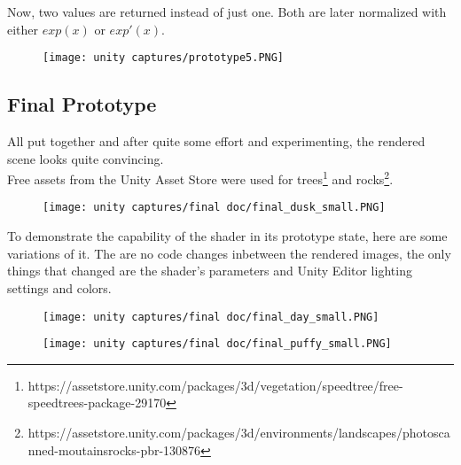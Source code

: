 \noindent
Now, two values are returned instead of just one. Both are later normalized with either $exp(x)$ or $exp'(x)$.

\begin{figure}[H]
    \centering
    \texttt{[image: unity captures/prototype5.PNG]}
    \label{img:captures:prototype5}
\end{figure}

\clearpage
\subsection{Final Prototype}
All put together and after quite some effort and experimenting, the rendered scene looks quite convincing. 
\\
Free assets from the Unity Asset Store were used for trees\footnote[1]{https://assetstore.unity.com/packages/3d/vegetation/speedtree/free-speedtrees-package-29170} and rocks\footnote[2]{https://assetstore.unity.com/packages/3d/environments/landscapes/photoscanned-moutainsrocks-pbr-130876}.

\begin{figure}[H]
    \centering
    \texttt{[image: unity captures/final doc/final\_dusk\_small.PNG]}
    \label{img:captures:prototype_final:afternoon}
\end{figure}

\clearpage
\noindent
To demonstrate the capability of the shader in its prototype state, here are some variations of it. The are no code changes inbetween the rendered images, the only things that changed are the shader's \gls{parameters} and Unity Editor lighting settings and colors.

\begin{figure}[H]
    \centering
        \begin{minipage}{0.47\linewidth}
            \texttt{[image: unity captures/final doc/final\_day\_small.PNG]}
            \label{img:captures:prototype_final:day}
        \end{minipage}
    \hfill
        \begin{minipage}{0.47\linewidth}
            \texttt{[image: unity captures/final doc/final\_puffy\_small.PNG]}
            \label{img:captures:prototype_final:puffy}
        \end{minipage}
\end{figure}

